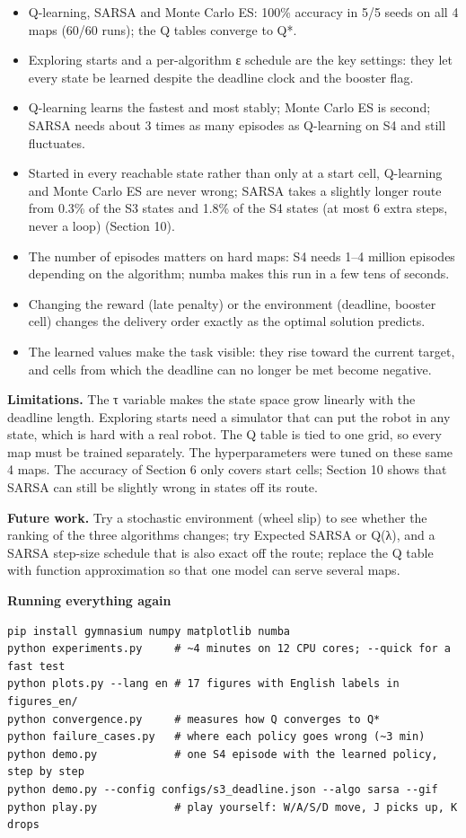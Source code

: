 \documentclass[12pt,a4paper]{article}
\begin{document}
\begin{itemize}
\item
  Q-learning, SARSA and Monte Carlo ES: 100\% accuracy in 5/5 seeds on
  all 4 maps (60/60 runs); the Q tables converge to Q*.
\item
  Exploring starts and a per-algorithm ε schedule are the key settings:
  they let every state be learned despite the deadline clock and the
  booster flag.
\item
  Q-learning learns the fastest and most stably; Monte Carlo ES is
  second; SARSA needs about 3 times as many episodes as Q-learning on S4
  and still fluctuates.
\item
  Started in every reachable state rather than only at a start cell,
  Q-learning and Monte Carlo ES are never wrong; SARSA takes a slightly
  longer route from 0.3\% of the S3 states and 1.8\% of the S4 states
  (at most 6 extra steps, never a loop) (Section 10).
\item
  The number of episodes matters on hard maps: S4 needs 1--4 million
  episodes depending on the algorithm; numba makes this run in a few
  tens of seconds.
\item
  Changing the reward (late penalty) or the environment (deadline,
  booster cell) changes the delivery order exactly as the optimal
  solution predicts.
\item
  The learned values make the task visible: they rise toward the current
  target, and cells from which the deadline can no longer be met become
  negative.
\end{itemize}

\textbf{Limitations.} The τ variable makes the state space grow linearly
with the deadline length. Exploring starts need a simulator that can put
the robot in any state, which is hard with a real robot. The Q table is
tied to one grid, so every map must be trained separately. The
hyperparameters were tuned on these same 4 maps. The accuracy of Section
6 only covers start cells; Section 10 shows that SARSA can still be
slightly wrong in states off its route.

\textbf{Future work.} Try a stochastic environment (wheel slip) to see
whether the ranking of the three algorithms changes; try Expected SARSA
or Q(λ), and a SARSA step-size schedule that is also exact off the
route; replace the Q table with function approximation so that one model
can serve several maps.

\textbf{Running everything again}

\begin{lstlisting}
pip install gymnasium numpy matplotlib numba
python experiments.py     # ~4 minutes on 12 CPU cores; --quick for a fast test
python plots.py --lang en # 17 figures with English labels in figures_en/
python convergence.py     # measures how Q converges to Q*
python failure_cases.py   # where each policy goes wrong (~3 min)
python demo.py            # one S4 episode with the learned policy, step by step
python demo.py --config configs/s3_deadline.json --algo sarsa --gif
python play.py            # play yourself: W/A/S/D move, J picks up, K drops
\end{lstlisting}
\end{document}
